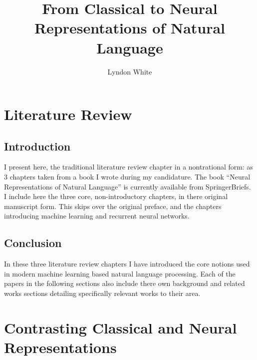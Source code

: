 \documentclass{book}
\title{From Classical to Neural Representations of Natural Language}
\author{Lyndon White}
\begin{document}
\maketitle
\tableofcontents

\part{Literature Review}
\chapter{Introduction}
I present here, the traditional literature review chapter in a nontrational form: as 3 chapters taken from a book I wrote during my candidature.
The book ``Neural Representations of Natural Language'' is currently available from SpringerBriefs.
I include here the three core, non-introductory chapters, in there original manuscript form.
This skips over the original preface, and the chapters introducing machine learning and recurrent neural networks.



\label{LR:WordRep}
\label{LR:SenseRep}
\label{LR:SentenceRep}

\chapter{Conclusion}
In these three literature review chapters I have introduced the core notions used in modern machine learning based natural language processing.
Each of the papers in the following sections also include there own background and related works sections detailing specifically relevant works to their area.


\part{Contrasting Classical and Neural Representations}
\end{document}
